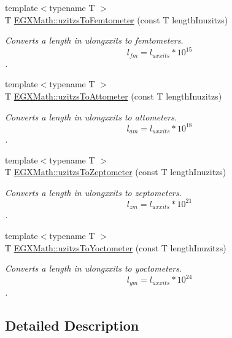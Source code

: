 \begin{DoxyCompactItemize}
{\footnotesize template$<$typename T $>$ }\\T \mbox{\hyperlink{group___e_g_x_math-_conversions-_length_conversions-_non-_s_i-uzitzs-_s_i_ga55b363df9781c5d92c86bcef272dfc7f}{E\+G\+X\+Math\+::uzitzs\+To\+Femtometer}} (const T length\+Inuzitzs)
\begin{DoxyCompactList}\small\item\em Converts a length in ulongxxits to femtometers. \[ l_{fm}=l_{uxxits} * 10^{15} \]. \end{DoxyCompactList}\item 
{\footnotesize template$<$typename T $>$ }\\T \mbox{\hyperlink{group___e_g_x_math-_conversions-_length_conversions-_non-_s_i-uzitzs-_s_i_ga33c3f00e9fadcd52f2c0bfbd71a33d2b}{E\+G\+X\+Math\+::uzitzs\+To\+Attometer}} (const T length\+Inuzitzs)
\begin{DoxyCompactList}\small\item\em Converts a length in ulongxxits to attometers. \[ l_{am}=l_{uxxits} * 10^{18} \]. \end{DoxyCompactList}\item 
{\footnotesize template$<$typename T $>$ }\\T \mbox{\hyperlink{group___e_g_x_math-_conversions-_length_conversions-_non-_s_i-uzitzs-_s_i_ga9057f57c3f49216e6272c6f0f29ded62}{E\+G\+X\+Math\+::uzitzs\+To\+Zeptometer}} (const T length\+Inuzitzs)
\begin{DoxyCompactList}\small\item\em Converts a length in ulongxxits to zeptometers. \[ l_{zm}=l_{uxxits} * 10^{21} \]. \end{DoxyCompactList}\item 
{\footnotesize template$<$typename T $>$ }\\T \mbox{\hyperlink{group___e_g_x_math-_conversions-_length_conversions-_non-_s_i-uzitzs-_s_i_gae0faf7639d852bfde8863b3615aa096a}{E\+G\+X\+Math\+::uzitzs\+To\+Yoctometer}} (const T length\+Inuzitzs)
\begin{DoxyCompactList}\small\item\em Converts a length in ulongxxits to yoctometers. \[ l_{ym}=l_{uxxits} * 10^{24} \]. \end{DoxyCompactList}\end{DoxyCompactItemize}


\subsection{Detailed Description}


